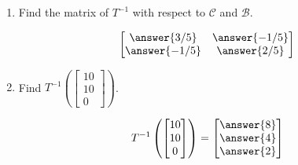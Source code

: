 \documentclass{ximera}
\begin{document}
\begin{problem}
\begin{enumerate}
    $$\begin{bmatrix}\answer{2}&\answer{1}\\\answer{1}&\answer{3}\end{bmatrix}$$
    \item
    Find the matrix of $T^{-1}$ with respect to $\mathcal{C}$ and $\mathcal{B}$.
    
    $$\begin{bmatrix}\answer{3/5}&\answer{-1/5}\\\answer{-1/5}&\answer{2/5}\end{bmatrix}$$
   \item
    Find $T^{-1}\left(\begin{bmatrix}10\\10\\0\end{bmatrix}\right)$.
    
    $$T^{-1}\left(\begin{bmatrix}10\\10\\0\end{bmatrix}\right)=\begin{bmatrix}\answer{8}\\\answer{4}\\\answer{2}\end{bmatrix}$$
    \end{enumerate}
    \end{problem}
\end{document}
